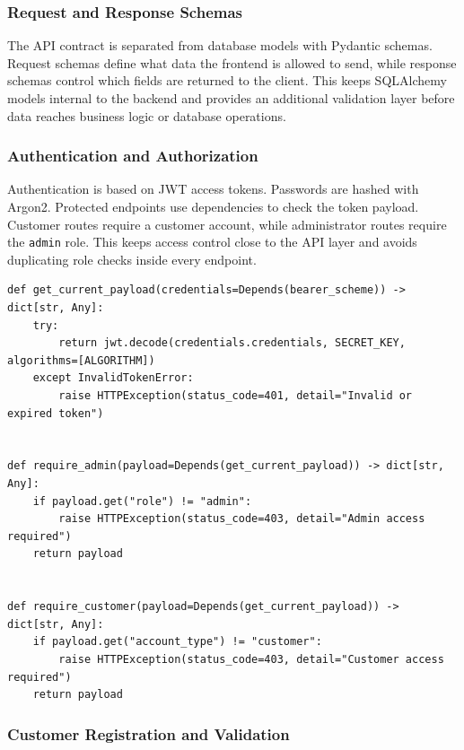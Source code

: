 \subsubsection{Request and Response Schemas}

The API contract is separated from database models with Pydantic schemas. Request schemas define what data the frontend is allowed to send, while response schemas control which fields are returned to the client. This keeps SQLAlchemy models internal to the backend and provides an additional validation layer before data reaches business logic or database operations.

\subsubsection{Authentication and Authorization}

Authentication is based on JWT access tokens. Passwords are hashed with Argon2. Protected endpoints use dependencies to check the token payload. Customer routes require a customer account, while administrator routes require the \texttt{admin} role. This keeps access control close to the API layer and avoids duplicating role checks inside every endpoint.

\begin{lstlisting}[style=pythonstyle,caption={JWT payload validation and role guards},label={lst:backend-auth-short}]
def get_current_payload(credentials=Depends(bearer_scheme)) -> dict[str, Any]:
    try:
        return jwt.decode(credentials.credentials, SECRET_KEY, algorithms=[ALGORITHM])
    except InvalidTokenError:
        raise HTTPException(status_code=401, detail="Invalid or expired token")


def require_admin(payload=Depends(get_current_payload)) -> dict[str, Any]:
    if payload.get("role") != "admin":
        raise HTTPException(status_code=403, detail="Admin access required")
    return payload


def require_customer(payload=Depends(get_current_payload)) -> dict[str, Any]:
    if payload.get("account_type") != "customer":
        raise HTTPException(status_code=403, detail="Customer access required")
    return payload
\end{lstlisting}

\subsubsection{Customer Registration and Validation}

